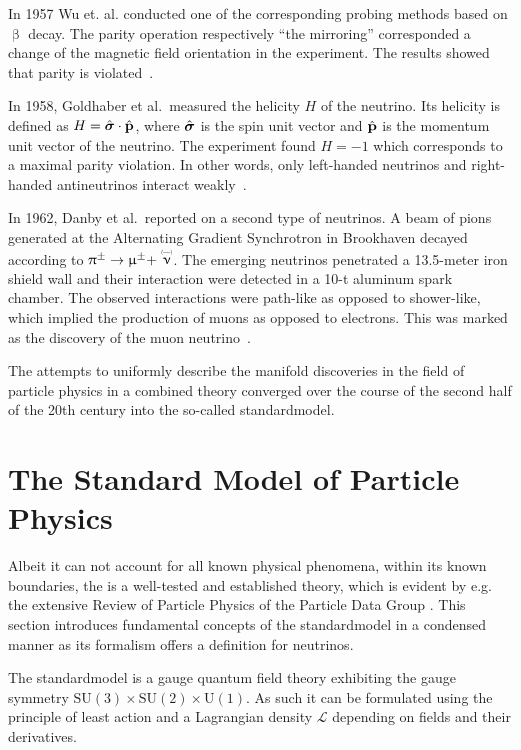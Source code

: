 In 1957 Wu et. al. conducted one of the corresponding probing methods based on $\upbeta$ decay. The parity operation respectively ``the mirroring'' corresponded a change of the magnetic field orientation in the experiment. The results showed that parity is violated~\cite{Wu1957}. 

In 1958, Goldhaber et al.~measured the helicity $H$ of the neutrino. Its helicity is defined as $ H = \hat{\boldsymbol{\mathbf{\sigma}}} \cdot \hat{\boldsymbol{\mathbf{p}}}$, where $\hat{\boldsymbol{\mathbf{\sigma}}}$ is the spin unit vector and $\hat{\boldsymbol{\mathbf{p}}}$ is the momentum unit vector of the neutrino. The experiment found $H = -1$ which corresponds to a maximal parity violation. In other words, only left-handed neutrinos and right-handed antineutrinos interact weakly~\cite{Goldhaber1958}.

In 1962, Danby et al.~reported on a second type of neutrinos. A beam of pions generated at the Alternating Gradient Synchrotron in Brookhaven decayed according to $\uppi^{\pm} \rightarrow \upmu^{\pm} + \maybeaneutrino$. The emerging neutrinos penetrated a 13.5-meter iron shield wall and their interaction were detected in a 10-t aluminum spark chamber. The observed interactions were path-like as opposed to shower-like, which implied the production of muons as opposed to electrons. This was marked as the discovery of the muon neutrino~\cite{Danby1962}.

The attempts to uniformly describe the manifold discoveries in the field of particle physics in a combined theory converged over the course of the second half of the 20th century into the so-called \gls{standardmodel}.
    
\section{The Standard Model of Particle Physics}
Albeit it can not account for all known physical phenomena, within its known boundaries, the  is a well-tested and established theory, which is evident by e.g. the extensive Review of Particle Physics of the Particle Data Group \cite{ReviewOfParticlePhysics}. This section introduces fundamental concepts of the \gls{standardmodel} in a condensed manner as its formalism offers a definition for neutrinos.

The \gls{standardmodel} is a gauge quantum field theory exhibiting the gauge symmetry $\text{SU}(3)\times\text{SU}(2)\times\text{U}(1)$. As such it can be formulated using the principle of least action and a Lagrangian density $\mathcal{L}$ depending on fields and their derivatives. 


